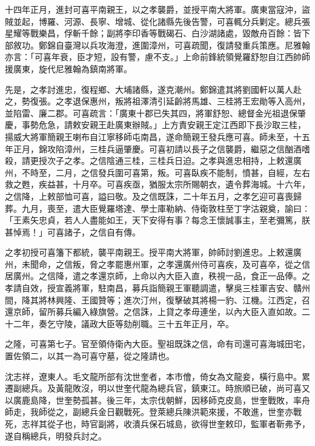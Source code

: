 \begin{pinyinscope}
十四年正月，進封可喜平南親王，以之孝襲爵，並授平南大將軍。廣東當寇沖，盜賊並起，博羅、河源、長寧、增城、從化諸縣先後告警，可喜輒分兵剿定。總兵張星耀等戰樂昌，俘斬千餘；副將李印香等戰碣石、白沙湖諸處，毀敵舟百餘：皆下部敘功。鄭錦自臺灣以兵攻海澄，進圍漳州，可喜疏聞，復請發重兵策應。尼雅翰亦言：「可喜年衰，臣才短，設有警，慮不支。」上命前鋒統領覺羅舒恕自江西帥師援廣東，旋代尼雅翰為鎮南將軍。

先是，之孝討進忠，復程鄉、大埔諸縣，遂克潮州。鄭錦遣其將劉國軒以萬人赴之，勢復張。之孝退保惠州，叛將祖澤清引延齡將馬雄、三桂將王宏勛等入高州，並陷雷、廉二郡。可喜疏言：「廣東十郡已失其四，將軍舒恕、總督金光祖退保肇慶，事勢危急，請敕安親王赴廣東辦賊。」上方責安親王定江西即下長沙取三桂，揚威大將軍簡親王喇布自江寧移師屯南昌，遂命簡親王發兵應可喜。師未至，十五年正月，錦攻陷漳州，三桂兵逼肇慶。可喜初請以長子之信襲爵，繼惡之信酗酒嗜殺，請更授次子之孝。之信陰通三桂，三桂兵日迫。之孝與進忠相持，上敕還廣州，不時至，二月，之信發兵圍可喜第，叛。可喜臥疾不能制，憤甚，自經，左右救之甦，疾益甚，十月卒。可喜疾亟，猶服太宗所賜朝衣，遺令葬海城。十六年，之信降，上敕部恤可喜，謚曰敬。及之信既誅，二十年五月，之孝乞迎可喜喪歸葬。九月，喪至，遣大臣覺羅塔達、學士庫勒納、侍衛敦柱至丁字沽親奠，諭曰：「王素矢忠貞，若人人盡能如王，天下安得有事？每念王懷誠事主，至老彌篤，朕甚悼焉！」可喜諸子，之信自有傳。

之孝初授可喜籓下都統，襲平南親王。授平南大將軍，帥師討劉進忠。上敕還廣州，未聞命，之信叛，脅之孝罷惠州軍，之孝還廣州侍可喜疾，及可喜卒，從之信居廣州。之信降，遣之孝還京師，上命以內大臣入直，秩視一品，食正一品俸。之孝請自效，授宣義將軍，駐南昌，募兵詣簡親王軍聽調遣，擊吳三桂軍吉安、贛州間，降其將林興隆、王國贊等；進次汀州，復擊破其將楊一豹、江機。江西定，召還京師，留所募兵編入綠旗營。之信誅，上貸之孝毋連坐，以內大臣入直如故。二十二年，奏乞守陵，議政大臣等劾削職。三十五年正月，卒。

之隆，可喜第七子。官至領侍衛內大臣。聖祖既誅之信，命有司還可喜海城田宅，置佐領二，以其一為可喜守墓，從之隆請也。

沈志祥，遼東人。毛文龍所部有沈世奎者，本市儈，倚女為文龍妾，橫行島中。累遷副總兵。及黃龍敗沒，明以世奎代龍為總兵官，鎮東江。時旅順已破，尚可喜又以廣鹿島降，世奎勢孤甚。後三年，太宗伐朝鮮，因移師克皮島，世奎戰敗，率舟師走，我師從之，副總兵金日觀戰死。登萊總兵陳洪範來援，不敢進，世奎亦戰死，志祥其從子也，時官副將，收潰兵保石城島，欲得世奎敕印，監軍者靳弗予，遂自稱總兵，明發兵討之。


\end{pinyinscope}
